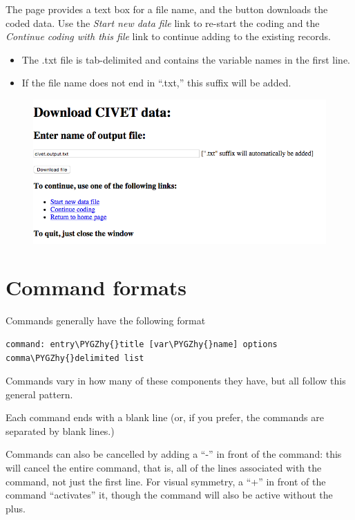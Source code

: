 \documentclass[letterpaper,10pt,english]{sphinxmanual}
\def\PYGZhy{\char`\-}
\begin{document}
The  page  provides a
text box for a file name, and the  button downloads the
coded data. Use the \emph{Start new data file} link to re-start the coding
and the \emph{Continue coding with this file} link to continue adding to the
existing records.
\begin{itemize}
\item {} 
The .txt file is tab-delimited and contains the variable names in the
first line.

\item {} 
If the file name does not end in “.txt,” this suffix will be added.

\end{itemize}
\begin{figure}[htbp]
\centering

\includegraphics{download.png}
\end{figure}


\section{Command formats}
\label{forms:command-formats}
Commands generally have the following format

\begin{Verbatim}[commandchars=\\\{\}]
command: entry\PYGZhy{}title [var\PYGZhy{}name] options
comma\PYGZhy{}delimited list
\end{Verbatim}

Commands vary in how many of these components they have, but all follow
this general pattern.

Each command ends with a blank line (or, if you prefer, the commands are
separated by blank lines.)

Commands can also be cancelled by adding a “-” in front of the command:
this will cancel the entire command, that is, all of the lines
associated with the command, not just the first line. For visual
symmetry, a “+” in front of the command “activates” it, though the
command will also be active without the plus.
\end{document}
